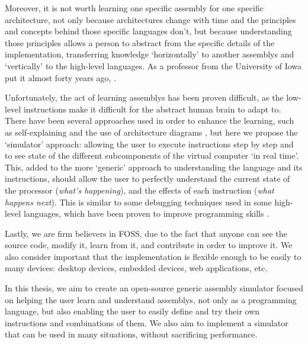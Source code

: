 Moreover, it is not worth learning one specific \gls{assembly} for one specific architecture, not only because architectures change with time and the principles and concepts behind those specific languages don't, but because understanding those principles allows a person to abstract from the specific details of the implementation, transferring knowledge `horizontally' to another \glspl{assembly} and `vertically' to the \glspl{high-level language}. As a professor from the University of Iowa put it almost forty years ago, .

Unfortunately, the act of learning \glspl{assembly} has been proven difficult, as the low-level instructions make it difficult for the abstract human brain to adapt to. There have been several approaches used in order to enhance the learning, such as self-explaining and the use of architecture diagrams \parencite{HungY.-C2012CSWC}, but here we propose the `simulator' approach: allowing the user to execute instructions step by step and to see state of the different subcomponents of the virtual \gls{computer} `in real time'. This, added to the more `generic' approach to understanding the language and its instructions, should allow the user to perfectly understand the current state of the processor (\textit{what's happening}), and the effects of each instruction (\textit{what happens next}). This is similar to some \gls{debugging} techniques used in some \glspl{high-level language}, which have been proven to improve programming skills \parencite{KLAHR1988362}.

Lastly, we are firm believers in \gls{FOSS}, due to the fact that anyone can see the source code, modify it, learn from it, and contribute in order to improve it. We also consider important that the implementation is flexible enough to be easily  to many devices: \glspl{desktop device}, \glspl{embedded device}, \glspl{web application}, etc.

In this thesis, we aim to create an open-source generic \gls{assembly} simulator focused on helping the user learn and understand \glspl{assembly}, not only as a \gls{programming language}, but also enabling the user to easily define and try their own instructions and combinations of them. We also aim to implement a simulator that can be used in many situations, without sacrificing performance.



